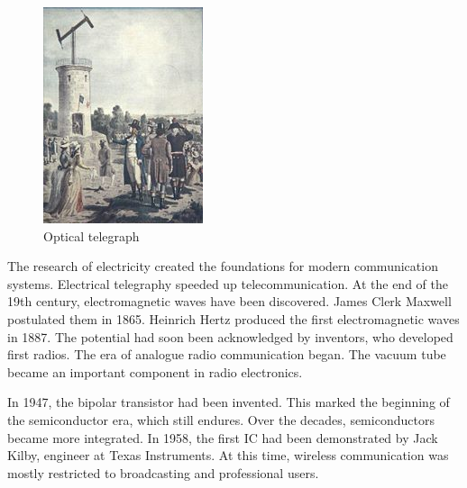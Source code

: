 \begin{refsection}
\begin{minipage}{0.45\linewidth}
\begin{figure}[H]
		\includegraphics[width=\linewidth]{../chapter00/OpticalTelegraph.jpg}
		\caption[Optical telegraph]{Optical telegraph \cite{WikiSemaphore}}
		\label{fig:preface:optical_telegraph}
	\end{figure}
\end{minipage}

The research of electricity created the foundations for modern communication systems. Electrical telegraphy speeded up telecommunication. At the end of the 19th century, electromagnetic waves have been discovered. James Clerk Maxwell postulated them in 1865. Heinrich Hertz produced the first electromagnetic waves in 1887. The potential had soon been acknowledged by inventors, who developed first radios. The era of analogue radio communication began. The  vacuum tube became an important component in radio electronics.

In 1947, the bipolar transistor had been invented. This marked the beginning of the semiconductor era, which still endures. Over the decades, semiconductors became more integrated. In 1958, the first \ac{IC} had been demonstrated by Jack Kilby, engineer at Texas Instruments. At this time, wireless communication was mostly restricted to broadcasting and professional users.


\end{refsection}
